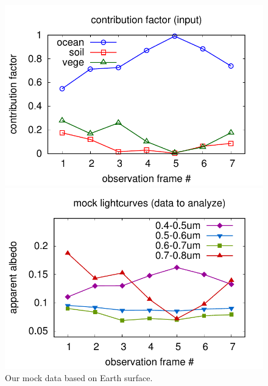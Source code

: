 \documentclass[iop,numberedappendix,apj,]{emulateapj}
\begin{document}
\begin{figure}[!bpth]
\begin{minipage}{0.5\hsize}
\begin{center}
\includegraphics[width=\hsize]{mockdata_quadrature_factor.pdf}
    \end{center}
 \end{minipage}
   \begin{minipage}{0.5\hsize}
    \begin{center}
\includegraphics[width=\hsize]{mockdata_quadrature_lc.pdf}
    \end{center}
 \end{minipage}
    \caption{Our mock data based on Earth surface. }
\label{fig:mockdata}
\end{figure}





\newpage


\end{document}
